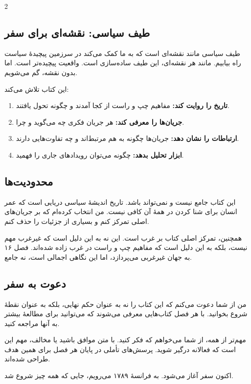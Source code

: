 \begin{multicols}{2}
\subsection*{طیف سیاسی: نقشه‌ای برای سفر}

طیف سیاسی مانند نقشه‌ای است که به ما کمک می‌کند در سرزمین پیچیدهٔ سیاست راه بیابیم. مانند هر نقشه‌ای، این طیف ساده‌سازی است. واقعیت پیچیده‌تر است. اما بدون نقشه، گم می‌شویم.

این کتاب تلاش می‌کند:
\begin{enumerate}
    \item \textbf{تاریخ را روایت کند:} مفاهیم چپ و راست از کجا آمدند و چگونه تحول یافتند.
    \item \textbf{جریان‌ها را معرفی کند:} هر جریان فکری چه می‌گوید و چرا.
    \item \textbf{ارتباطات را نشان دهد:} جریان‌ها چگونه به هم مرتبط‌اند و چه تفاوت‌هایی دارند.
    \item \textbf{ابزار تحلیل بدهد:} چگونه می‌توان رویدادهای جاری را فهمید.
\end{enumerate}

\subsection*{محدودیت‌ها}

این کتاب جامع نیست و نمی‌تواند باشد. تاریخ اندیشهٔ سیاسی دریایی است که عمر انسان برای شنا کردن در همهٔ آن کافی نیست. من انتخاب کرده‌ام که بر جریان‌های اصلی تمرکز کنم و بسیاری از جزئیات را حذف کنم.

همچنین، تمرکز اصلی کتاب بر غرب است. این نه به این دلیل است که غیرغرب مهم نیست، بلکه به این دلیل است که مفاهیم چپ و راست در غرب زاده شده‌اند. فصل ۱۶ به جهان غیرغربی می‌پردازد، اما این نگاهی اجمالی است، نه جامع.

\subsection*{دعوت به سفر}

من از شما دعوت می‌کنم که این کتاب را نه به عنوان حکم نهایی، بلکه به عنوان نقطهٔ شروع بخوانید. با هر فصل کتاب‌هایی معرفی می‌شوند که می‌توانید برای مطالعهٔ بیشتر به آنها مراجعه کنید.

مهم‌تر از همه، از شما می‌خواهم که فکر کنید. با متن موافق باشید یا مخالف، مهم این است که فعالانه درگیر شوید. پرسش‌های تأملی در پایان هر فصل برای همین هدف طراحی شده‌اند.

اکنون سفر آغاز می‌شود. به فرانسهٔ ۱۷۸۹ می‌رویم، جایی که همه چیز شروع شد.

\end{multicols}